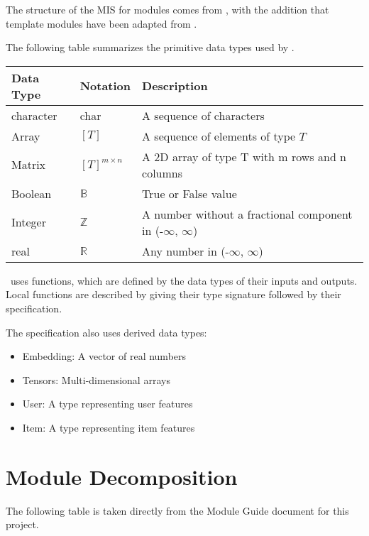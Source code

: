 \documentclass[12pt, titlepage]{article}
\begin{document}
The structure of the MIS for modules comes from \citet{HoffmanAndStrooper1995},
with the addition that template modules have been adapted from
\cite{GhezziEtAl2003}.

The following table summarizes the primitive data types used by \progname. 

\begin{center}
\renewcommand{\arraystretch}{1.2}
\noindent 
\begin{tabular}{l l p{7.5cm}} 
\toprule 
\textbf{Data Type} & \textbf{Notation} & \textbf{Description}\\ 
\midrule
character & char & A sequence of characters\\
Array & $[T]$ & A sequence of elements of type $T$\\
Matrix &$[T]^{m\times n}$ & A 2D array of type T with m rows and n columns\\
Boolean & $\mathbb{B}$ & True or False value\\
Integer & $\mathbb{Z}$ & A number without a fractional component in (-$\infty$, $\infty$) \\
real & $\mathbb{R}$ & Any number in (-$\infty$, $\infty$)\\
\bottomrule
\end{tabular} 
\end{center}

\noindent
\progname \ uses functions, which
are defined by the data types of their inputs and outputs. Local functions are
described by giving their type signature followed by their specification.

The specification also uses derived data types:
\begin{itemize}
  \item Embedding: A vector of real numbers
  \item Tensors: Multi-dimensional arrays
  \item User: A type representing user features
  \item Item: A type representing item features
\end{itemize}


\section{Module Decomposition}

The following table is taken directly from the Module Guide document for this project.
\end{document}
